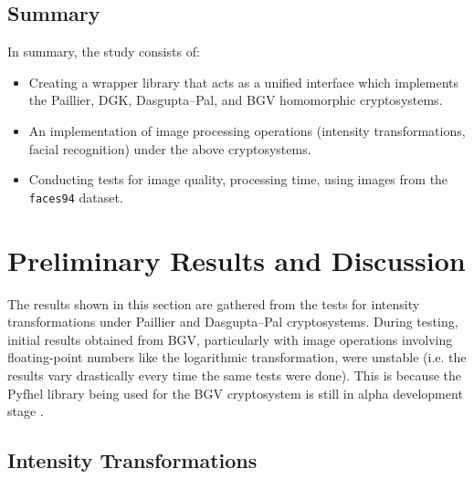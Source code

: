 \subsection{Summary}
In summary, the study consists of:
\begin{itemize}
	\item Creating a wrapper library that acts as a unified interface which implements the Paillier, DGK, Dasgupta--Pal, and BGV homomorphic cryptosystems.
	\item An implementation of image processing operations (intensity transformations, facial recognition) under the above cryptosystems.
	\item Conducting tests for image quality, processing time, using images from the \texttt{faces94} dataset.
\end{itemize}

\section{Preliminary Results and Discussion}
The results shown in this section are gathered from the tests for intensity transformations under Paillier and Dasgupta--Pal cryptosystems. During testing, initial results obtained from BGV, particularly with image operations involving floating-point numbers like the logarithmic transformation, were unstable (i.e. the results vary drastically every time the same tests were done). This is because the Pyfhel library being used for the BGV cryptosystem is still in alpha development stage \cite{pyfhel_2018}. 


\subsection{Intensity Transformations}

